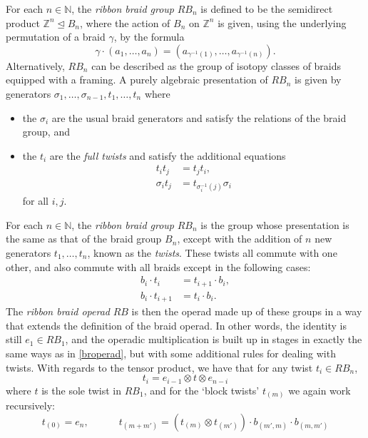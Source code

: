 \begin{example}\label{example:aop-rbraid}
For each $n \in \mathbb{N}$, the \emph{ribbon braid group} $RB_{n}$ is defined to be the semidirect product $\mathbb{Z}^n \trianglelefteq B_n$, where the action of $B_n$ on $\mathbb{Z}^n$ is given, using the underlying permutation of a braid $\gamma$, by the formula
\[
\gamma \cdot (a_1, \ldots, a_n) = (a_{\gamma^{-1}(1)}, \ldots, a_{\gamma^{-1}(n)}).
\]
Alternatively, $RB_n$ can be described as the group of isotopy classes of braids equipped with a framing. A purely algebraic presentation of $RB_n$ is given by generators $\sigma_1, \ldots, \sigma_{n-1}, t_1, \ldots, t_n$ where 
\begin{itemize}
\item the $\sigma_i$ are the usual braid generators and satisfy the relations of the braid group, and 
\item the $t_i$ are the \emph{full twists} and satisfy the additional equations
\begin{align*}
t_i t_j & = t_j t_i, \\
\sigma_i t_j & = t_{\sigma_i^{-1}(j)} \sigma_i
\end{align*}
for all $i, j$.
\end{itemize}


For each $n \in \mathbb{N}$, the \emph{ribbon braid group} $RB_{n}$ is the group whose presentation is the same as that of the braid group $B_{n}$, except with the addition of $n$ new generators $t_1, \ldots, t_n$, known as the \emph{twists}. These twists all commute with one other, and also commute with all braids except in the following cases:
  \begin{align*}
    b_i \cdot t_i &= t_{i+1} \cdot b_i,\\
    b_i \cdot t_{i+1} &= t_i \cdot b_i.
  \end{align*}
The \emph{ribbon braid operad} $RB$ is then the operad made up of these groups in a way that extends the definition of the braid operad. In other words, the identity is still $e_1 \in RB_1$, and the operadic multiplication is built up in stages in exactly the same ways as in \cref{broperad}, but with some additional rules for dealing with twists. With regards to the tensor product, we have that for any twist $t_i \in RB_{n}$,
  \[
    t_i = e_{i-1} \otimes t \otimes e_{n-i}
  \]
where $t$ is the sole twist in $RB_1$, and for the `block twists' $t_{(m)}$ we again work recursively:
  \[
    t_{(0)} = e_n, \quad \quad \quad t_{(m+m')} = \left(t_{(m)} \otimes t_{(m')}\right) \cdot b_{(m', m)} \cdot b_{(m, m')}
  \]
\end{example}

